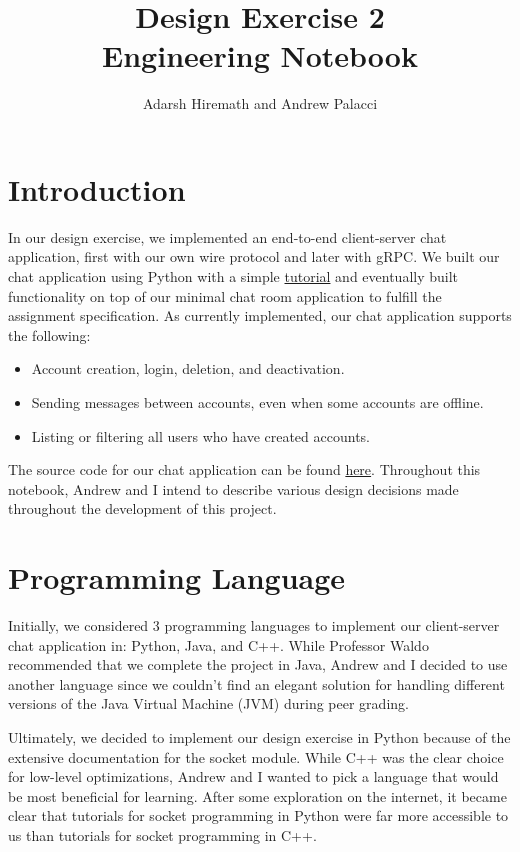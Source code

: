 \documentclass[
	a4paper, %
	10pt, %
	unnumberedsections, %
	twoside, %
]{LTJournalArticle}
\title{Design Exercise 2\\ Engineering Notebook} %
\author{%
	Adarsh Hiremath and Andrew Palacci
}
\begin{document}
\maketitle %


\section{Introduction}
In our design exercise, we implemented an end-to-end client-server chat application, first with our own wire protocol and later with gRPC. We built our chat application using Python with a simple \href{https://www.geeksforgeeks.org/simple-chat-room-using-python/}{tutorial} and eventually built functionality on top of our minimal chat room application to fulfill the assignment specification. As currently implemented, our chat application supports the following: 
\begin{itemize}
    \item Account creation, login, deletion, and deactivation. 
    \item Sending messages between accounts, even when some accounts are offline. 
    \item Listing or filtering all users who have created accounts. 
\end{itemize}

The source code for our chat application can be found \href{https://github.com/ahiremathh/chat_protocol}{here}. Throughout this notebook, Andrew and I intend to describe various design decisions made throughout the development of this project. 

\section{Programming Language}
Initially, we considered 3 programming languages to implement our client-server chat application in: Python, Java, and C++. While Professor Waldo recommended that we complete the project in Java, Andrew and I decided to use another language since we couldn't find an elegant solution for handling different versions of the Java Virtual Machine (JVM) during peer grading. 

Ultimately, we decided to implement our design exercise in Python because of the extensive documentation for the socket module. While C++ was the clear choice for low-level optimizations, Andrew and I wanted to pick a language that would be most beneficial for learning. After some exploration on the internet, it became clear that tutorials for socket programming in Python were far more accessible to us than tutorials for socket programming in C++. 
\end{document}
